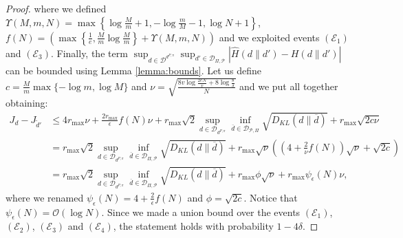 \begin{proof}
	where we defined $\Upsilon(M,m,N) = \max\left\{ \log \frac{M}{m} + 1,  -\log \frac{m}{M} - 1, \log N + 1 \right\}$, \newline $f(N) = \left( \max \left\{ \frac{1}{e}, \frac{M}{m} \log \frac{M}{m} \right\} + \Upsilon(M,m,N) \right)$ and we exploited events $(\mathcal{E}_1)$ and $(\mathcal{E}_3)$. Finally, the term $\sup_{d \in \mathcal{D}^{d^{P,\pi}}} \sup_{d' \in \mathcal{D}_{\Pi,\mathcal{P}}} \left| \widehat{H} (d \| d') -  H(d \| d') \right|$ can be bounded using Lemma \ref{lemma:bounds}. Let us define $c=\frac{M}{m} \max\{-\log m, \log M \}$ and $\nu=\sqrt{\frac{8v \log\frac{2eN}{v} + 8 \log \frac{8}{\delta}}{N}}$ and we put all together obtaining:
	\begin{align*}
		J_{d} - J_{\widetilde{d}'} & \le 4 r_{\max} \nu + \frac{2 r_{\max}}{\epsilon} f(N) \nu + r_{\max} \sqrt{2}  \sup_{d \in \mathcal{D}_{d^{P,\pi}}}  \inf_{\overline{d} \in \mathcal{D}_{\mathcal{P},\Pi}} \sqrt{D_{KL}( d \| \overline{d})} + r_{\max} \sqrt{2c \nu} \\
		& =  r_{\max} \sqrt{2}  \sup_{d \in \mathcal{D}_{d^{P,\pi}}}  \inf_{\overline{d} \in \mathcal{D}_{\Pi,\mathcal{P}}} \sqrt{D_{KL}( d \| \overline{d})}  + r_{\max} \sqrt{\nu} \left( \left( 4 + \frac{2}{\nu} f(N) \right) \sqrt{\nu} + \sqrt{2c} \right) \\
		& =  r_{\max} \sqrt{2}  \sup_{d \in \mathcal{D}_{d^{P,\pi}}}  \inf_{\overline{d} \in \mathcal{D}_{\Pi,\mathcal{P}}} \sqrt{D_{KL}( d \| \overline{d})}  + r_{\max} \phi \sqrt{\nu} + r_{\max} \psi_{\epsilon}(N) \nu,
	\end{align*}
	where we renamed $\psi_{\epsilon}(N) = 4 + \frac{2}{\epsilon} f(N)$ and $\phi = \sqrt{2c}$. Notice that $\psi_{\epsilon}(N) = \mathcal{O}(\log N)$. Since we made a union bound over the events  $(\mathcal{E}_1)$,  $(\mathcal{E}_2)$,  $(\mathcal{E}_3)$ and  $(\mathcal{E}_4)$, the statement holds with probability $1-4\delta$.
\end{proof}